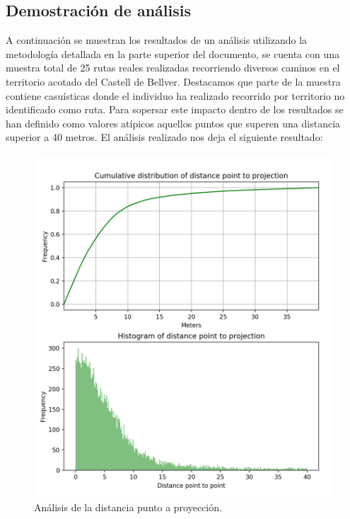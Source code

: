 \subsection{Demostración de análisis}
A continuación se muestran los resultados de un análisis utilizando la metodología 
detallada en la parte superior del documento, se cuenta con una muestra total de 25 
rutas reales realizadas recorriendo diversos caminos en el territorio acotado del Castell 
de Bellver. Destacamos que parte de la muestra contiene casuísticas donde el 
individuo ha realizado recorrido por territorio no identificado como ruta. Para sopersar 
este impacto dentro de los resultados se han definido como valores atípicos aquellos 
puntos que superen una distancia superior a 40 metros. El análisis realizado nos deja el 
siguiente resultado:
\begin{figure}[!htb]
\begin{minipage}{0.48\textwidth}
\centering
\includegraphics[width=1.2\textwidth]{./Imagenes/PointToProjection.png}
\caption{Análisis de la distancia punto a proyección.}
\label{figure:PointToProjection}
\end{minipage}\hfill
\begin{minipage}{0.48\textwidth}

\end{minipage}
\end{figure}
